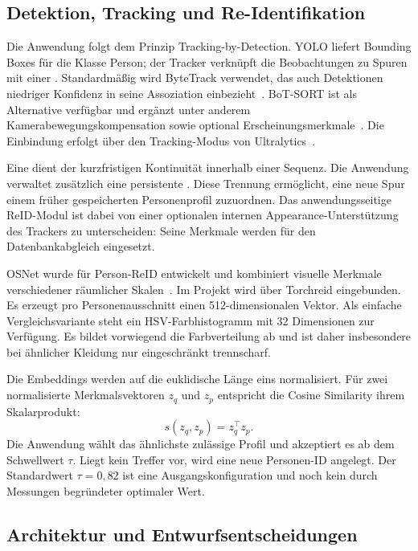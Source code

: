 \documentclass[runningheads]{llncs}
\begin{document}
\subsection{Detektion, Tracking und Re-Identifikation}

Die Anwendung folgt dem Prinzip Tracking-by-Detection. YOLO liefert Bounding Boxes für die Klasse Person; der Tracker verknüpft die Beobachtungen zu Spuren mit einer . Standardmä{\ss}ig wird ByteTrack verwendet, das auch Detektionen niedriger Konfidenz in seine Assoziation einbezieht~\cite{zhang2022bytetrack}. BoT-SORT ist als Alternative verfügbar und ergänzt unter anderem Kamerabewegungskompensation sowie optional Erscheinungsmerkmale~\cite{aharon2022botsort}. Die Einbindung erfolgt über den Tracking-Modus von Ultralytics~\cite{ultralytics-track}.

Eine  dient der kurzfristigen Kontinuität innerhalb einer Sequenz. Die Anwendung verwaltet zusätzlich eine persistente . Diese Trennung ermöglicht, eine neue Spur einem früher gespeicherten Personenprofil zuzuordnen. Das anwendungsseitige ReID-Modul ist dabei von einer optionalen internen Appearance-Unterstützung des Trackers zu unterscheiden: Seine Merkmale werden für den Datenbankabgleich eingesetzt.

OSNet wurde für Person-ReID entwickelt und kombiniert visuelle Merkmale verschiedener räumlicher Skalen~\cite{zhou2019osnet}. Im Projekt wird  über Torchreid eingebunden. Es erzeugt pro Personenausschnitt einen 512-dimensionalen Vektor. Als einfache Vergleichsvariante steht ein HSV-Farbhistogramm mit 32 Dimensionen zur Verfügung. Es bildet vorwiegend die Farbverteilung ab und ist daher insbesondere bei ähnlicher Kleidung nur eingeschränkt trennscharf.

Die Embeddings werden auf die euklidische Länge eins normalisiert. Für zwei normalisierte Merkmalsvektoren $z_q$ und $z_p$ entspricht die Cosine Similarity ihrem Skalarprodukt:
\begin{equation}
s(z_q,z_p)=z_q^\top z_p.
\label{eq:cosine}
\end{equation}
Die Anwendung wählt das ähnlichste zulässige Profil und akzeptiert es ab dem Schwellwert $\tau$. Liegt kein Treffer vor, wird eine neue Personen-ID angelegt. Der Standardwert $\tau=0{,}82$ ist eine Ausgangskonfiguration und noch kein durch Messungen begründeter optimaler Wert.

\subsection{Architektur und Entwurfsentscheidungen}
\end{document}
